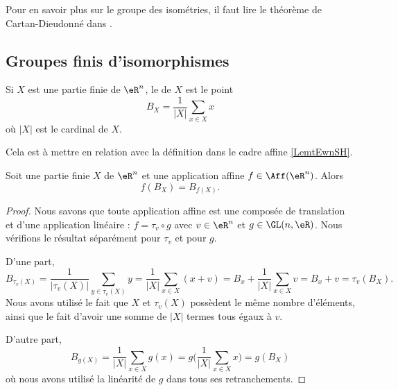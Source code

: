 Pour en savoir plus sur le groupe des isométries, il faut lire le théorème de Cartan-Dieudonné dans \cite{JGAdTA}.

\subsection{Groupes finis d'isomorphismes}

\begin{definition}
    Si \( X\) est une partie finie de \( \eR^n\), le  de \( X\) est le point
    \begin{equation}
        B_X=\frac{1}{ | X | }\sum_{x\in X}x
    \end{equation}
    où \( | X |\) est le cardinal de \( X\).
\end{definition}
Cela est à mettre en relation avec la définition dans le cadre affine \ref{LemtEwnSH}.

\begin{lemma}
    Soit une partie finie \( X\) de \( \eR^n\) et une application affine \( f\in\Aff(\eR^n)\). Alors
    \begin{equation}
        f(B_X)=B_{f(X)}.
    \end{equation}
\end{lemma}

\begin{proof}
    Nous savons que toute application affine est une composée de translation et d'une application linéaire : \( f=\tau_v\circ g\) avec \( v\in \eR^n\) et \( g\in \GL(n,\eR)\). Nous vérifions le résultat séparément pour \( \tau_v\) et pour \( g\).

    D'une part,
    \begin{equation}
        B_{\tau_v(X)}=\frac{1}{ | \tau_v(X) | }\sum_{y\in \tau_v(X)}y=\frac{1}{ | X | }\sum_{x\in X}(x+v)=B_x+\frac{1}{ | X | }\sum_{x\in X}v=B_x+v=\tau_v(B_X).
    \end{equation}
    Nous avons utilisé le fait que \( X\) et \( \tau_v(X)\) possèdent le même nombre d'éléments, ainsi que le fait d'avoir une somme de \( | X |\) termes tous égaux à \( v\).

    D'autre part,
    \begin{equation}
        B_{g(X)}=\frac{1}{ | X | }\sum_{x\in X}g(x)=g\big( \frac{1}{ |X | }\sum_{x\in X}x \big)=g(B_X)
    \end{equation}
    où nous avons utilisé la linéarité de \( g\) dans tous ses retranchements.
\end{proof}

